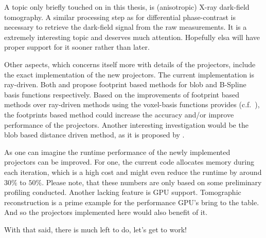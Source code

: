 A topic only briefly touched on in this thesis, is (anisotropic) X-ray dark-field tomography. A
similar processing step as for differential phase-contrast is necessary to retrieve the dark-field
signal from the raw measurements. It is a extremely interesting topic and deserves much attention.
Hopefully elsa will have proper support for it sooner rather than later.

Other aspects, which concerns itself more with details of the projectors, include the exact
implementation of the new projectors. The current implementation is ray-driven. Both
\textcite*{kohler_iterative_2011} and \textcite*{momey_spline_2015} propose footprint based methods
for blob and B-Spline basis functions respectively. Based on the improvements of footprint based
methods over ray-driven methods using the voxel-basis functions provides (c.f.~\cite{long_3d_2010}),
the footprints based method could increase the accuracy and/or improve performance of the
projectors. Another interesting investigation would be the blob based distance driven method, as it
is proposed by \textcite*{levakhina_distance-driven_2010}.

As one can imagine the runtime performance of the newly implemented projectors can be improved. For
one, the current code allocates memory during each iteration, which is a high cost and might even
reduce the runtime by around \(30\%\) to \(50\%\). Please note, that these numbers are only based on
some preliminary profiling conducted. Another lacking feature is GPU support. Tomographic
reconstruction is a prime example for the performance GPU's bring to the table. And so the
projectors implemented here would also benefit of it.

\begin{flushright}
	With that said, there is much left to do, let's get to work!
\end{flushright}
